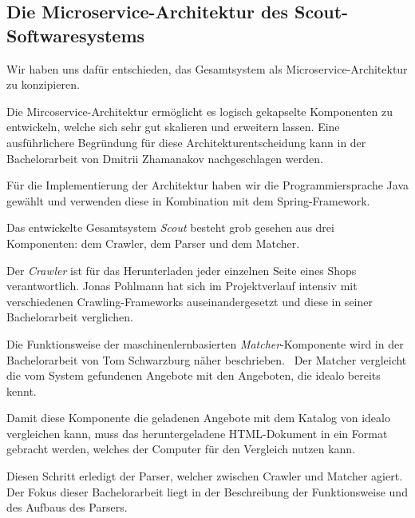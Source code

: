 \subsection{Die Microservice-Architektur des Scout-Softwaresystems}
\label{subsec:microservice-architektur}

Wir haben uns dafür entschieden, das Gesamtsystem als Microservice-Architektur zu konzipieren.

Die Mircoservice-Architektur ermöglicht es logisch gekapselte Komponenten zu entwickeln, welche sich sehr gut
skalieren und erweitern lassen.
Eine ausführlichere Begründung für diese Architekturentscheidung kann in der Bachelorarbeit von Dmitrii
Zhamanakov nachgeschlagen werden.~\cite{thesis:dmitrii}

Für die Implementierung der Architektur haben wir die Programmiersprache Java gewählt und verwenden diese in
Kombination mit dem Spring-Framework\footnotemark.

Das entwickelte Gesamtsystem \textit{Scout} besteht grob gesehen aus drei Komponenten: dem Crawler, dem Parser und dem
Matcher.

Der \textit{Crawler} ist für das Herunterladen jeder einzelnen Seite eines Shops verantwortlich.
Jonas Pohlmann hat sich im Projektverlauf intensiv mit verschiedenen Crawling-Frameworks auseinandergesetzt und diese
in seiner Bachelorarbeit verglichen.~\cite{thesis:jonas}

Die Funktionsweise der maschinenlernbasierten \textit{Matcher}-Komponente wird in der Bachelorarbeit von Tom
Schwarzburg näher beschrieben.~\cite{thesis:tom}
Der Matcher vergleicht die vom System gefundenen Angebote mit den Angeboten, die idealo bereits kennt.

Damit diese Komponente die geladenen Angebote mit dem Katalog von idealo vergleichen kann, muss das heruntergeladene
HTML-Dokument in ein Format gebracht werden, welches der Computer für den Vergleich nutzen kann.

Diesen Schritt erledigt der Parser, welcher zwischen Crawler und Matcher agiert.
Der Fokus dieser Bachelorarbeit liegt in der Beschreibung der Funktionsweise und des Aufbaus des Parsers.